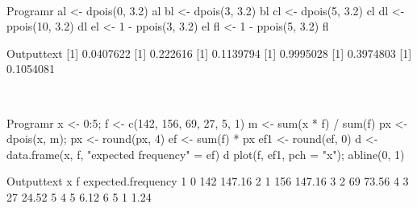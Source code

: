 ~
\begin{code}
    {Program}{r}
al <- dpois(0, 3.2)
al
bl <- dpois(3, 3.2)
bl
cl <- dpois(5, 3.2)
cl
dl <- ppois(10, 3.2)
dl
el <- 1 - ppois(3, 3.2)
el
fl <- 1 - ppois(5, 3.2)
fl
\end{code}
\begin{code}
    {Output}{text}
[1] 0.0407622
[1] 0.222616
[1] 0.1139794
[1] 0.9995028
[1] 0.3974803
[1] 0.1054081
\end{code}

\\[10pt]
\begin{code}
    {Program}{r}
x <- 0:5; f <- c(142, 156, 69, 27, 5, 1)
m <- sum(x * f) / sum(f)
px <- dpois(x, m); px <- round(px, 4)
ef <- sum(f) * px
ef1 <- round(ef, 0)
d <- data.frame(x, f, "expected frequency" = ef)
d
plot(f, ef1, pch = "x"); abline(0, 1)
\end{code}
\begin{code}
    {Output}{text}
  x   f expected.frequency
1 0 142             147.16
2 1 156             147.16
3 2  69              73.56
4 3  27              24.52
5 4   5               6.12
6 5   1               1.24
\end{code}

